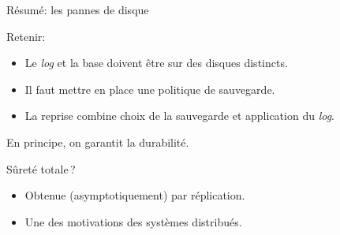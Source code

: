 \begin{frame}{Résumé: les pannes de disque}

Retenir:

\vfill

\begin{itemize}

  \item Le \textit{log} et la base doivent être sur des disques distincts.
  
  
  \item Il faut mettre en place une politique de sauvegarde.
 
 \item La reprise combine choix de la sauvegarde et application du \textit{log}.
 \end{itemize}

\vfill

En principe, on \alert{garantit} la durabilité.
\vfill

\alert{Sûreté totale}\,? 

\begin{itemize}

  \item  Obtenue (asymptotiquement)
par \alert{réplication}. 

\item Une des motivations des systèmes distribués.
\end{itemize}
\end{frame}

